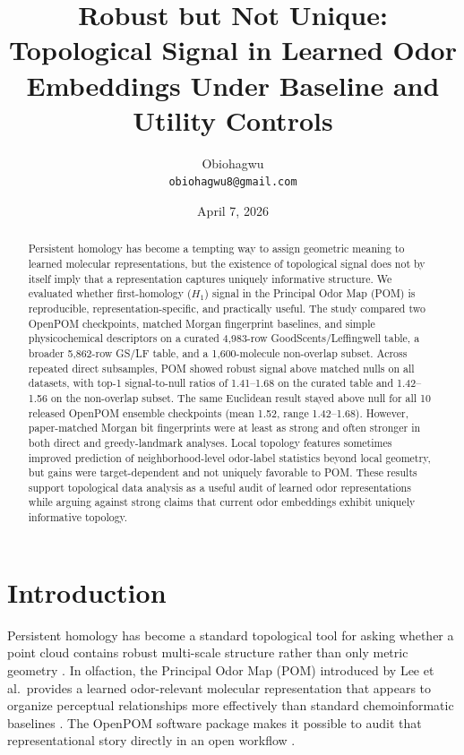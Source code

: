 \documentclass[11pt]{article}
\title{Robust but Not Unique:\\Topological Signal in Learned Odor Embeddings Under Baseline and Utility Controls}
\author{Obiohagwu\\\texttt{obiohagwu8@gmail.com}}
\date{April 7, 2026}
\begin{document}
\maketitle

\begin{abstract}
Persistent homology has become a tempting way to assign geometric meaning to learned molecular representations, but the existence of topological signal does not by itself imply that a representation captures uniquely informative structure. We evaluated whether first-homology ($H_1$) signal in the Principal Odor Map (POM) is reproducible, representation-specific, and practically useful. The study compared two OpenPOM checkpoints, matched Morgan fingerprint baselines, and simple physicochemical descriptors on a curated 4,983-row GoodScents/Leffingwell table, a broader 5,862-row GS/LF table, and a 1,600-molecule non-overlap subset. Across repeated direct subsamples, POM showed robust signal above matched nulls on all datasets, with top-1 signal-to-null ratios of 1.41--1.68 on the curated table and 1.42--1.56 on the non-overlap subset. The same Euclidean result stayed above null for all 10 released OpenPOM ensemble checkpoints (mean 1.52, range 1.42--1.68). However, paper-matched Morgan bit fingerprints were at least as strong and often stronger in both direct and greedy-landmark analyses. Local topology features sometimes improved prediction of neighborhood-level odor-label statistics beyond local geometry, but gains were target-dependent and not uniquely favorable to POM. These results support topological data analysis as a useful audit of learned odor representations while arguing against strong claims that current odor embeddings exhibit uniquely informative topology.
\end{abstract}

\section{Introduction}

Persistent homology has become a standard topological tool for asking whether a point cloud contains robust multi-scale structure rather than only metric geometry \cite{edelsbrunner2008persistent,ghrist2008barcodes}. In olfaction, the Principal Odor Map (POM) introduced by Lee et al.\ provides a learned odor-relevant molecular representation that appears to organize perceptual relationships more effectively than standard chemoinformatic baselines \cite{lee2023pom}. The OpenPOM software package makes it possible to audit that representational story directly in an open workflow \cite{barsainyan2023openpom}.
\end{document}
